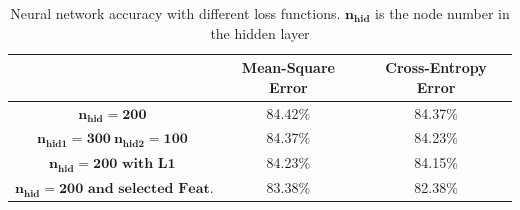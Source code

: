\documentclass[conference]{IEEEtran}
\begin{document}
\begin{table}[h]
\centering
\begin{tabular}{|c|c|c|}
\hline
                                   & \textbf{Mean-Square Error} & \textbf{Cross-Entropy Error} \\ \hline
$\mathbf{n_{hid}=200}$               & 84.42\%                    & 84.37\%                      \\ \hline
$\mathbf{n_{hid1}=300 \ n_{hid2}=100}$    & 84.37\%                    & 84.23\%                      \\ \hline
$\mathbf{n_{hid}=200 \textbf{ with L1}}$             & 84.23\%                    & 84.15\%                      \\ \hline
$\mathbf{n_{hid}=200 \textbf{ and selected Feat.}}$ & 83.38\%                    & 82.38\%                      \\ \hline
\end{tabular}
\caption{Neural network accuracy with different loss functions. $\mathbf{n_{hid}}$ is the node number in the hidden layer}
\label{table:nnets}
\end{table}
\end{document}
